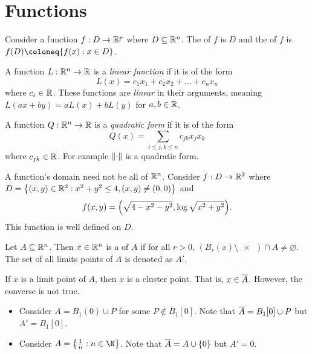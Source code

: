 \documentclass[../main.tex]{subfiles}
\begin{document}
\chapter{Functions}

\begin{definition}
    Consider a function $f : D \to \mathbb{R}^p$ where $D \subseteq \mathbb{R}^n$. The  of $f$ is $D$ and the  of $f$ is $f(D) \coloneq \qty{ f(x) : x \in D }$.
\end{definition}

\begin{example}
    A function $L : \mathbb{R}^n \to \mathbb{R}$ is a \emph{linear function} if it is of the form
    \[
        L(x) = c_1 x_1 + c_2 x_2 + \ldots + c_n x_n
    \]
    where $c_i \in \mathbb{R}$. These functions are \emph{linear} in their arguments, meaning $L(ax + by) = aL(x) + bL(y)$ for $a,b \in \mathbb{R}$.
\end{example}

\begin{example}
    A function $Q : \mathbb{R}^n \to \mathbb{R}$ is a \emph{quadratic form} if it is of the form
    \[
        Q(x) = \sum_{i \leq j,k \leq n} c_{jk} x_j x_k
    \]
    where $c_{jk} \in \mathbb{R}$. For example $\norm{\cdot}$ is a quadratic form.
\end{example}

\begin{example}
    A function's domain need not be all of $\mathbb{R}^n$. Consider $f : D \to \mathbb{R}^2$ where $D = \qty{(x,y) \in \mathbb{R}^2 : x^2 + y^2 \leq 4, (x,y) \neq (0,0)}$ and
    \[
        f(x,y) = \qty(\sqrt{4 - x^2 - y^2}, \log \sqrt{x^2 + y^2})
    .\]
    This function is well defined on $D$.
\end{example}

\begin{definition}
    Let $A \subseteq \mathbb{R}^n$. Then $x \in \mathbb{R}^n$ is a  of $A$ if for all $r > 0$, $(B_r(x) \setminus \qty{x}) \cap A \neq \varnothing$. The set of all limits points of $A$ is denoted as $A'$.
\end{definition}

\begin{remark}
    If $x$ is a limit point of $A$, then $x$ is a cluster point. That is, $x \in \overline{A}$. However, the converse is not true. 
    \begin{itemize}
        \item Consider $A = B_1(0) \cup P$ for some $P \notin B_1[0]$. Note that $\overline{A} = B_1[0] \cup P$ but $A' = B_1[0]$.
        \item Consider $A = \qty{\frac{1}{n} : n \in \N}$. Note that $\overline{A} = A \cup \qty{0}$ but $A' = \qty{0}$.
    \end{itemize}
\end{remark}
\end{document}
